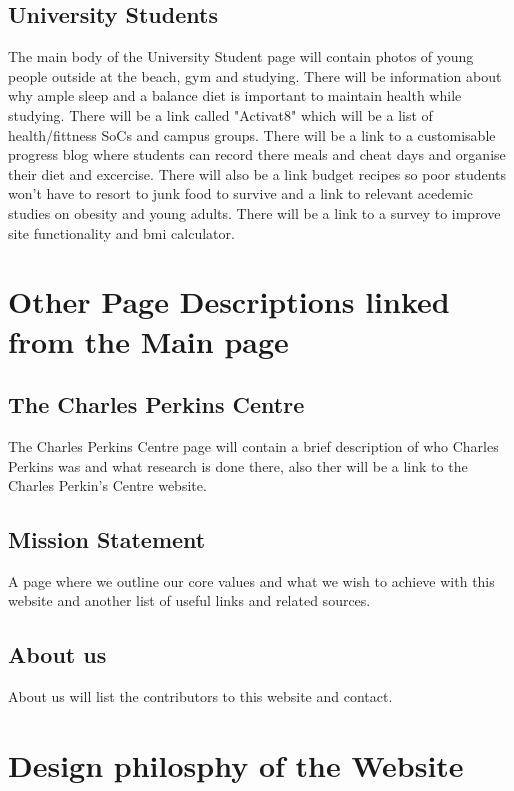 \documentclass[letterpaper,12pt]{article}
\begin{document}
\subsection{University Students}

The main body of the University Student page will contain photos of young people outside at the beach, gym and studying. There will be information about why ample sleep and a balance diet is important to maintain health while studying. There will be a link called "Activat8" which will be a list of health/fittness SoCs and campus groups. There will be a link to a customisable progress blog where students can record there meals and cheat days and organise their diet and excercise. There will also be a link budget recipes so poor students won't have to resort to junk food to survive and a link to relevant acedemic studies on obesity and young adults. There will be a link to a survey to improve site functionality and \acrshort{bmi} calculator.

\section{Other Page Descriptions linked from the Main page}

\subsection{The Charles Perkins Centre}

The Charles Perkins Centre page will contain a brief description of who Charles Perkins was and what research is done there, also ther will be a link to the Charles Perkin's Centre website.

\subsection{Mission Statement} 

A page where we outline our core values and what we wish to achieve with this website and another list of useful links and related sources.

\subsection{About us}

About us will list the contributors to this website and contact.

\section{Design philosphy of the Website}
\end{document}
